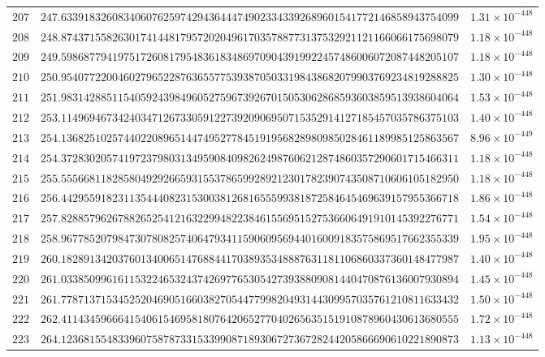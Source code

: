 \documentclass[12pt,reqno]{amsart}
\theoremstyle{remark}
\begin{document}
\begin{longtable}{clc}
$207$ & $247.6339183260834060762597429436444749023343392689601541772146858943754099$ & $1.31\times 10^{-448}$ \\
$208$ & $248.8743715582630174144817957202049617035788773137532921121166066175698079$ & $1.18\times 10^{-448}$ \\
$209$ & $249.5986877941975172608179548361834869709043919922457486006072087448205107$ & $1.18\times 10^{-448}$ \\
$210$ & $250.9540772200460279652287636557753938705033198438682079903769234819288825$ & $1.30\times 10^{-448}$ \\
$211$ & $251.9831428851154059243984960527596739267015053062868593603859513938604064$ & $1.53\times 10^{-448}$ \\
$212$ & $253.1149694673424034712673305912273920906950715352914127185457035786375103$ & $1.40\times 10^{-448}$ \\
$213$ & $254.1368251025744022089651447495277845191956828980985028461189985125863567$ & $8.96\times 10^{-449}$ \\
$214$ & $254.3728302057419723798031349590840982624987606212874860357290601715466311$ & $1.18\times 10^{-448}$ \\
$215$ & $255.5556681182858049292665931553786599289212301782390743508710606105182950$ & $1.18\times 10^{-448}$ \\
$216$ & $256.4429559182311354440823153003812681655599381872584645469639157955366718$ & $1.86\times 10^{-448}$ \\
$217$ & $257.8288579626788265254121632299482238461556951527536606491910145392276771$ & $1.54\times 10^{-448}$ \\
$218$ & $258.9677852079847307808257406479341159060956944016009183575869517662355339$ & $1.95\times 10^{-448}$ \\
$219$ & $260.1828913420376013400651476884417038935348887631181106860337360148477987$ & $1.40\times 10^{-448}$ \\
$220$ & $261.0338509961611532246532437426977653054273938809081440470876136007930894$ & $1.45\times 10^{-448}$ \\
$221$ & $261.7787137153452520469051660382705447799820493144309957035761210811633432$ & $1.50\times 10^{-448}$ \\
$222$ & $262.4114345966641540615469581807642065277040265635151910878960430613680555$ & $1.72\times 10^{-448}$ \\
$223$ & $264.1236815548339607587873315339908718930672736728244205866690610221890873$ & $1.13\times 10^{-448}$ \\

\end{longtable}
\end{document}
